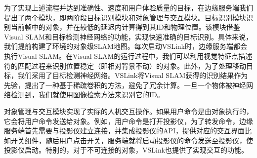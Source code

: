 为了实现上述流程并达到准确性、速度和用户体验质量的目标，在边缘服务端我们提出了两个模块，即两阶段目标识别模块和对象管理与交互模块。目标识别模块识别当前帧中的对象，并在较低的延迟内计算得到其ID和物理位置。该模块借鉴Visual SLAM和目标检测神经网络的功能，实现快速准确的目标识别。具体来说，我们提前构建了环境的对象级SLAM地图。每次启动VSLink时，边缘服务端都会执行Visual SLAM。在Visual SLAM的运行过程中，我们可以利用视觉特征点描述符的匹配过程来识别位置稳定（即相对背景不动）的对象。此外，为了处理移动目标，我们采用了目标检测神经网络。VSLink将Visual SLAM获得的识别结果作为先验，提出了一种基于稀疏卷积的方法，避免了冗余计算。一旦一个物体被神经网络检测到，我们就使用图像检索方法来识别它的ID。

对象管理与交互模块实现了实际的人机交互操作。如果用户命令是由对象执行的，它会将用户命令发送给对象。例如，用户命令是打开投影仪，为了转发命令，边缘服务端首先需要与投影仪建立连接，并集成投影仪的API，提供对应的交互界面比如开关组件，随后用户点击开关，服务端就将启动投影仪的命令发送至投影仪，使投影仪启动。特别的，对于不可连接的对象，VSLink也提供了实现交互的功能。

